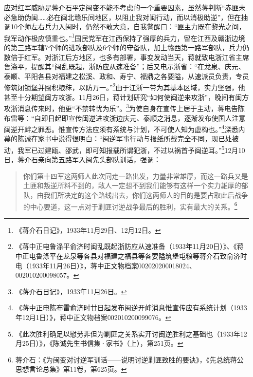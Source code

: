应对红军威胁是蒋介石平定闽变不能不考虑的一个重要因素，虽然蒋判断“赤匪未必急助伪闽……必在闽北赣乐间地区，以阻止我对闽行动，而以消极助逆”，但在抽调10个师左右兵力入闽时，仍然不敢大意，自我警醒曰：“匪主力既在黎光之间，我军动作极应慎重也。”\footnote{《蒋介石日记》，1933年11月29日、12月12日。}国民党军在江西保持了强厚的兵力，留在江西及赣浙边境的第三路军辖7个师的进攻部队及6个师的守备队，加上赣西第一路军部队，兵力仍数倍于红军。对浙江后方地区，也多有部署，事变发动当天，蒋就致电浙江省主席鲁涤平，提醒其“闽乱既起，浙防应从速准备”；后又电示浙省：“在龙泉、庆元、泰顺、平阳各县对福建之松溪、政和、寿宁、福鼎之各要隘，从速派员负责，专员修筑闭锁堡并囤积粮秣，以防万一。”\footnote{《蒋中正电鲁涤平俞济时闽乱既起浙防应从速准备（1933年11月20日）》、《蒋中正电鲁涤平在龙泉等各县对福建之福县等各要隘筑堡屯粮等蒋介石致俞济时电（1933年11月26日）》，蒋中正文物档案002020200018024、002010200098057。}由于江浙一带为其基本区域，实力坚强，他甚至十分期望闽方攻浙。11月26日，蒋计划研究“如何使闽逆来攻浙”，晚间有闽方攻浙消息传来时，他更“不禁转忧为乐”。\footnote{《蒋介石日记》，1933年11月26日。}为使自身在宣传上居于主动，蒋电告陈布雷等：“自即日起即宣传闽逆进攻浙边庆元、泰顺之消息，逐渐发布使国人注意闽逆开衅之罪恶。惟宣传方法应须有系统与计划，不可使人知为虚构也。”\footnote{《蒋中正电陈布雷俞济时廿日起发布闽逆开衅消息惟宣传应有系统计划（1933年12月1日）》，蒋中正文物档案002010200099076。}深悉内幕的陈诚在家书中说得很明白：“闽逆军事行动与报纸所载完全不同，现已处被动，我军已过建瓯、邵武，即可知报载所谓犯浙，不过以祸首予闽逆耳。”\footnote{《此次胜利确足以慰劳非但为剿匪之关系实开讨闽逆胜利之基础也（1933年12月25日）》，《陈诚先生书信集·家书》（上），第251页。}12月10日，蒋介石亲向第五路军入闽先头部队训话，强调：

\begin{quote}

你们第十四军这两师人此次同走一路出发，力量非常雄厚，而这一路兵又是土匪和叛逆所料不到的，敌人一定想不到我们能够有这样一个实力雄厚的部队，由我们所决定的这个路线出去，你们这两师人的目的是要占取此后战争的中心要道，这一点对于剿匪讨逆战争最后的胜利，实有最大的关系。\footnote{蒋介石：《为闽变对讨逆军训话——说明讨逆剿匪致胜的要诀》，《先总统蒋公思想言论总集》第11卷，第625页。}
\end{quote}


